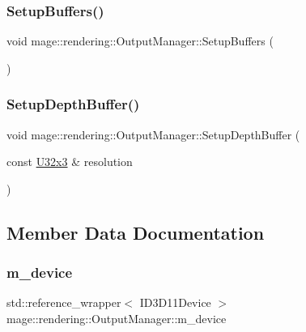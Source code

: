 \subsubsection{\texorpdfstring{Setup\+Buffers()}{SetupBuffers()}}
{\footnotesize\ttfamily void mage\+::rendering\+::\+Output\+Manager\+::\+Setup\+Buffers (\begin{DoxyParamCaption}{ }\end{DoxyParamCaption})\hspace{0.3cm}{\ttfamily [private]}}

\hypertarget{classmage_1_1rendering_1_1_output_manager_a4cbd2dd771206b15d934657205475ae1}{}\label{classmage_1_1rendering_1_1_output_manager_a4cbd2dd771206b15d934657205475ae1} 
\subsubsection{\texorpdfstring{Setup\+Depth\+Buffer()}{SetupDepthBuffer()}}
{\footnotesize\ttfamily void mage\+::rendering\+::\+Output\+Manager\+::\+Setup\+Depth\+Buffer (\begin{DoxyParamCaption}\item[{const \hyperlink{namespacemage_ab3633c193f686845fcf80ce95d18a20b}{U32x3} \&}]{resolution }\end{DoxyParamCaption})\hspace{0.3cm}{\ttfamily [private]}}



\subsection{Member Data Documentation}
\hypertarget{classmage_1_1rendering_1_1_output_manager_ad0f8b4613dfbd613576a3c58c8ff4c37}{}\label{classmage_1_1rendering_1_1_output_manager_ad0f8b4613dfbd613576a3c58c8ff4c37} 
\subsubsection{\texorpdfstring{m\+\_\+device}{m\_device}}
{\footnotesize\ttfamily std\+::reference\+\_\+wrapper$<$ I\+D3\+D11\+Device $>$ mage\+::rendering\+::\+Output\+Manager\+::m\+\_\+device\hspace{0.3cm}{\ttfamily [private]}}

